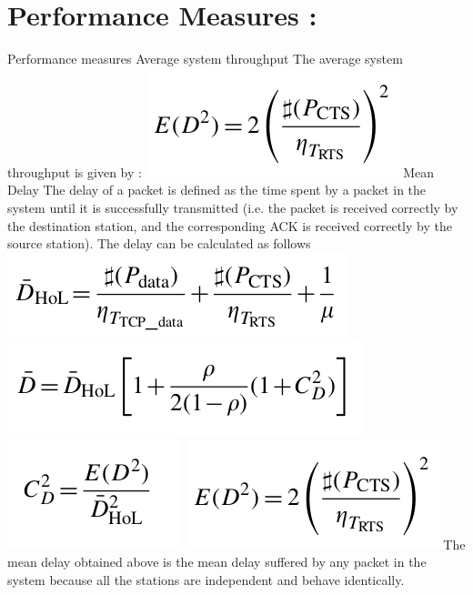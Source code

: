 \documentclass[a4paper,12pt]{article}
\begin{document}
\section {Performance Measures  :}
Performance measures
Average system throughput
The average system throughput is given by :
 \includegraphics[]{formula.png}
Mean Delay
The delay of a packet is defined as the time spent by a packet in the system
until it is successfully transmitted (i.e. the packet is received correctly by
the destination station, and the corresponding ACK is received correctly by
the source station).
The delay can be calculated as follows
 \includegraphics[scale=0.5]{formula2.png}
 \includegraphics[scale=0.5]{formula3.png}
 \includegraphics[scale=0.5]{formula4.png}
 \includegraphics[scale=0.5]{formula5.png}
The mean delay obtained above is the mean delay suffered by any packet
in the system because all the stations are independent and behave identically.
\end{document}
